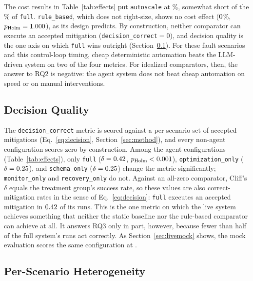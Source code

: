The cost results in Table~\ref{tab:effects} put \texttt{autoscale} at \NRelpctCostUnitsAutoscale{}\%,
somewhat short of the \NRelpctCostUnitsFull{}\% of \texttt{full}. \texttt{rule\_based}, which does not
right-size, shows no cost effect ($0{}$\%,
$p_{\mathrm{Holm}}=1.000{}$), as its design predicts. By construction, neither
comparator can execute an accepted mitigation (\texttt{decision\_correct}$=0$), and decision quality is
the one axis on which \texttt{full} wins outright (Section~\ref{sec:decision}). For these fault
scenarios and this control-loop timing, cheap deterministic automation beats the LLM-driven system on
two of the four metrics. For idealized comparators, then, the answer to RQ2 is negative: the agent
system does not beat cheap automation on speed or on manual interventions.

\subsection{Decision Quality}\label{sec:decision}

The \texttt{decision\_correct} metric is scored against a per-scenario set of accepted mitigations
(Eq.~\eqref{eq:decision}, Section~\ref{sec:method}), and every non-agent configuration scores zero by
construction. Among the agent configurations (Table~\ref{tab:effects}), only \texttt{full}
($\delta=0.42{}$, $p_{\mathrm{Holm}}<0.001{}$),
\texttt{optimization\_only} ($\delta=0.25{}$), and
\texttt{schema\_only} ($\delta=0.25{}$) change the metric significantly;
\texttt{monitor\_only} and \texttt{recovery\_only} do not. Against an all-zero comparator, Cliff's
$\delta$ equals the treatment group's success rate, so these values are also correct-mitigation
rates in the sense of Eq.~\eqref{eq:decision}: \texttt{full} executes an accepted mitigation in $0.42{}$ of its runs.
This is the one metric on which the live system achieves something that neither the static baseline
nor the rule-based comparator can achieve at all. It answers RQ3 only in part, however, because fewer
than half of the full system's runs act correctly. As Section~\ref{sec:livemock} shows, the mock
evaluation scores the same configuration at \NLiveVsMockDecisionCorrectMock{}.

\subsection{Per-Scenario Heterogeneity}

